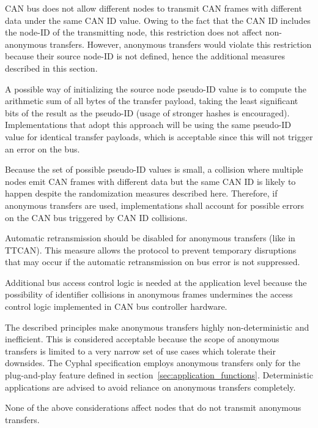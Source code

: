 \begin{remark}[breakable]
    CAN bus does not allow different nodes to transmit CAN frames with different data under the same CAN ID value.
    Owing to the fact that the CAN ID includes the node-ID of the transmitting node,
    this restriction does not affect non-anonymous transfers.
    However, anonymous transfers would violate this restriction because their source node-ID is not defined,
    hence the additional measures described in this section.

    A possible way of initializing the source node pseudo-ID value is to compute the arithmetic sum
    of all bytes of the transfer payload, taking the least significant bits of the result as the pseudo-ID
    (usage of stronger hashes is encouraged).
    Implementations that adopt this approach will be using the same pseudo-ID value for identical transfer payloads,
    which is acceptable since this will not trigger an error on the bus.

    Because the set of possible pseudo-ID values is small,
    a collision where multiple nodes emit CAN frames with different data but the same CAN ID is likely to happen
    despite the randomization measures described here.
    Therefore, if anonymous transfers are used,
    implementations shall account for possible errors on the CAN bus triggered by CAN ID collisions.

    Automatic retransmission should be disabled for anonymous transfers (like in TTCAN).
    This measure allows the protocol to prevent temporary disruptions that may occur if the automatic
    retransmission on bus error is not suppressed.

    Additional bus access control logic is needed at the application level because
    the possibility of identifier collisions in anonymous frames undermines the access control logic implemented
    in CAN bus controller hardware.

    The described principles make anonymous transfers highly non-deterministic and inefficient.
    This is considered acceptable because the scope of anonymous transfers is limited to a very narrow set of use
    cases which tolerate their downsides. The Cyphal specification employs anonymous transfers only for the
    plug-and-play feature defined in section~\ref{sec:application_functions}.
    Deterministic applications are advised to avoid reliance on anonymous transfers completely.

    None of the above considerations affect nodes that do not transmit anonymous transfers.
\end{remark}

